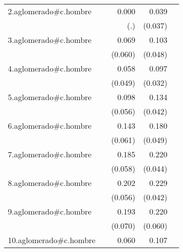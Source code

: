 {\begin{longtable}{l*{4}{D{.}{.}{-1}}}
\addlinespace
2.aglomerado#c.hombre&                     &       0.000         &       0.039         &                     \\
            &                     &         (.)         &     (0.037)         &                     \\
\addlinespace
3.aglomerado#c.hombre&                     &       0.069         &       0.103\sym{*}  &                     \\
            &                     &     (0.060)         &     (0.048)         &                     \\
\addlinespace
4.aglomerado#c.hombre&                     &       0.058         &       0.097\sym{**} &                     \\
            &                     &     (0.049)         &     (0.032)         &                     \\
\addlinespace
5.aglomerado#c.hombre&                     &       0.098         &       0.134\sym{**} &                     \\
            &                     &     (0.056)         &     (0.042)         &                     \\
\addlinespace
6.aglomerado#c.hombre&                     &       0.143\sym{*}  &       0.180\sym{***}&                     \\
            &                     &     (0.061)         &     (0.049)         &                     \\
\addlinespace
7.aglomerado#c.hombre&                     &       0.185\sym{**} &       0.220\sym{***}&                     \\
            &                     &     (0.058)         &     (0.044)         &                     \\
\addlinespace
8.aglomerado#c.hombre&                     &       0.202\sym{***}&       0.229\sym{***}&                     \\
            &                     &     (0.056)         &     (0.042)         &                     \\
\addlinespace
9.aglomerado#c.hombre&                     &       0.193\sym{**} &       0.220\sym{***}&                     \\
            &                     &     (0.070)         &     (0.060)         &                     \\
\addlinespace
10.aglomerado#c.hombre&                     &       0.060         &       0.107\sym{**} &                     \\

\end{longtable}}
